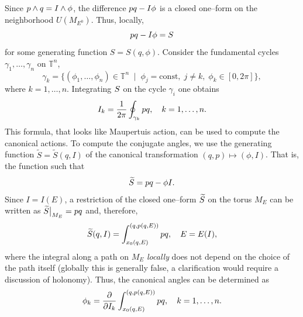 \documentclass[english,fontsize=11pt,paper=a5,oneside]{scrbook}
\newcommand{\T}{\mathbb{T}}
\let\d\relax
\newcommand{\d}{\mathrm{d}}
\theoremstyle{definition}
\begin{document}
Since $\d p \wedge \d q = \d I \wedge \d \phi$, the difference $p\d q - I\d \phi$ is a closed one--form on the neighborhood $U(M_{E^0})$. Thus, locally,
\begin{equation}
  p\d q - I\d \phi = \d S
\end{equation}
for some generating function $S = S(q,\phi)$.
Consider the fundamental cycles $\gamma_1, \ldots, \gamma_n$ on $\T^n$,
\begin{equation}
  \gamma_k = \big\{
  (\phi_1, \ldots, \phi_n) \in \T^n \;\mid\; \phi_j = \mathrm{const}, \; j\neq k,\; \phi_k \in [0,2\pi]
  \big\},
\end{equation}
where $k=1,\ldots,n$.
Integrating $\d S$ on the cycle $\gamma_i$ one obtains
\begin{equation}
  I_k = \frac1{2\pi} \oint_{\gamma_k} p \d q, \quad k=1,\ldots,n.
\end{equation}
This formula, that looks like Maupertuis action, can be used to compute the canonical actions.
To compute the conjugate angles, we use the generating function $\widetilde S = \widetilde S(q,I)$ of the canonical transformation $(q,p) \mapsto (\phi, I)$. That is, the function such that
\begin{equation}
  \d\widetilde S = p\d q - \phi \d I.
\end{equation}
Since $I = I(E)$, a restriction of the closed one--form $\d\widetilde S$ on the torus $M_E$ can be written as $\d\widetilde S\big|_{M_E} = p\d q$ and, therefore,
\begin{equation}
  \widetilde S(q,I) = \int_{x_0(q,E)}^{(q, p(q,E))} p \d q, \quad E = E(I),
\end{equation}
where the integral along a path on $M_E$ \emph{locally} does not depend on the choice of the path itself (globally this is generally false, a clarification would require a discussion of holonomy).
Thus, the canonical angles can be determined as
\begin{equation}
  \phi_k = \frac{\partial}{\partial I_k} \int_{x_0(q,E)}^{(q, p(q,E))} p \d q, \quad k=1,\ldots,n.
\end{equation}
\end{document}
